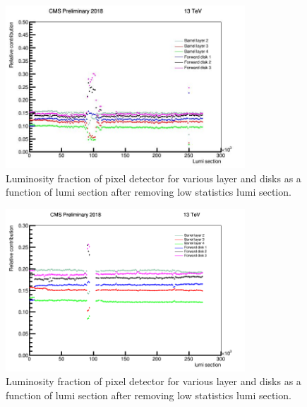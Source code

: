 \begin{figure}[!htp]
\centering
\includegraphics[width=0.8\textwidth]{ashish_thesis/pixel_layer_disk_noveto_noselection.png}
\caption{%
   Luminosity fraction of pixel detector for various layer and disks as a function of lumi section after removing low statistics lumi section.
}
\label{fig:PCC_stab_begin}
\end{figure}



\begin{figure}[!htp]
\centering
\includegraphics[width=0.8\textwidth]{ashish_thesis/pcc_frac_L0_veto.png}
\caption{%
   Luminosity fraction of pixel detector for various layer and disks as a function of lumi section after removing low statistics lumi section.
}
\label{fig:PCC_stab_L0_veto}
\end{figure}










